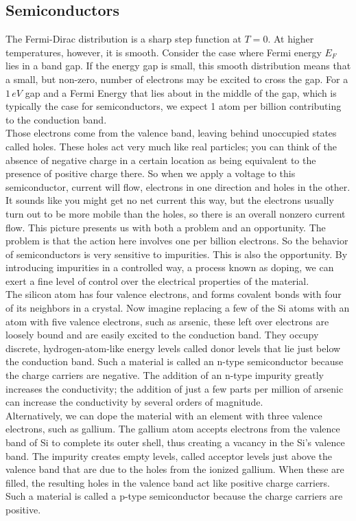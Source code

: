 \documentclass[11pt]{article}
\theoremstyle{break}
\theoremstyle{break}
\begin{document}
\subsection{Semiconductors}
The Fermi-Dirac distribution is a sharp step function at $T=0$. At higher temperatures, however, it is smooth. Consider the case where Fermi energy $E_F$ lies in a band gap. If the energy gap is small, this smooth distribution means that a small, but non-zero, number of electrons may be excited to cross the gap. For a $1\,eV$ gap and a Fermi Energy that lies about in the middle of the gap, which is typically the case for semiconductors, we expect 1 atom per billion contributing to the conduction band.\\

Those electrons come from the valence band, leaving behind unoccupied states called holes. These holes act very much like real particles; you can think of the absence of negative charge in a certain location as being equivalent to the presence of positive charge there. So when we apply a voltage to this semiconductor, current will
flow, electrons in one direction and holes in the other. It sounds like you might get no net current this way, but the electrons usually turn out to be more mobile than the holes, so there is an overall nonzero current flow. This picture presents us with both a problem and an opportunity. The problem is that the action here involves one per billion electrons. So the behavior of semiconductors is very sensitive to impurities. This is also the opportunity. By introducing impurities in a controlled way, a process known as doping, we can exert a fine level of control over the electrical properties of the material.\\

The silicon atom has four valence electrons, and forms covalent bonds with four of its neighbors in a crystal. Now imagine replacing a few of the Si atoms with an atom with five valence electrons, such as arsenic, these left over electrons are loosely bound and are easily
excited to the conduction band. They occupy discrete, hydrogen-atom-like energy levels called donor levels that lie just below the conduction band. Such a material is called an n-type semiconductor because the charge carriers are negative. The addition of an n-type impurity greatly increases the conductivity; the addition of just a few parts per million of arsenic can increase the conductivity by several orders of magnitude.\\

Alternatively, we can dope the material with an element with three valence electrons, such as gallium. The gallium atom accepts electrons from the valence band of Si to complete its outer shell, thus creating a vacancy in the Si's valence band. The impurity creates empty levels, called
acceptor levels just above the valence band that are due to the holes from the ionized gallium. When these are filled, the resulting holes in the valence band act like positive charge carriers. Such a material is called a p-type semiconductor because the charge carriers are positive.\\
\end{document}
